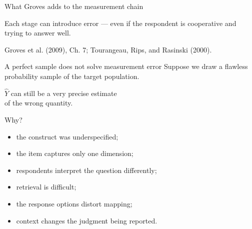 \documentclass[11pt,aspectratio=169]{beamer}
\newcommand{\ct}[1]{\vfill{\tiny\color{custom_darkGray}#1}}
\begin{document}
\begin{frame}{What Groves adds to the measurement chain}
\centering
{}

\vspace{1.4em}
\pause
Each stage can introduce error --- even if the respondent is cooperative and trying to answer well.

\vfill
\ct{Groves et al. (2009), Ch. 7; Tourangeau, Rips, and Rasinski (2000).}
\end{frame}

\begin{frame}{A perfect sample does not solve measurement error}
Suppose we draw a flawless probability sample of the target population.

\pause
\begin{center}
\Large $\widehat{Y}$ can still be a very precise estimate\\[0.4em]
\Large of the \alert{wrong quantity}.
\end{center}

\pause
Why?
\begin{itemize}
\item the construct was underspecified;
\item the item captures only one dimension;
\item respondents interpret the question differently;
\item retrieval is difficult;
\item the response options distort mapping;
\item context changes the judgment being reported.
\end{itemize}
\end{frame}
\end{document}
